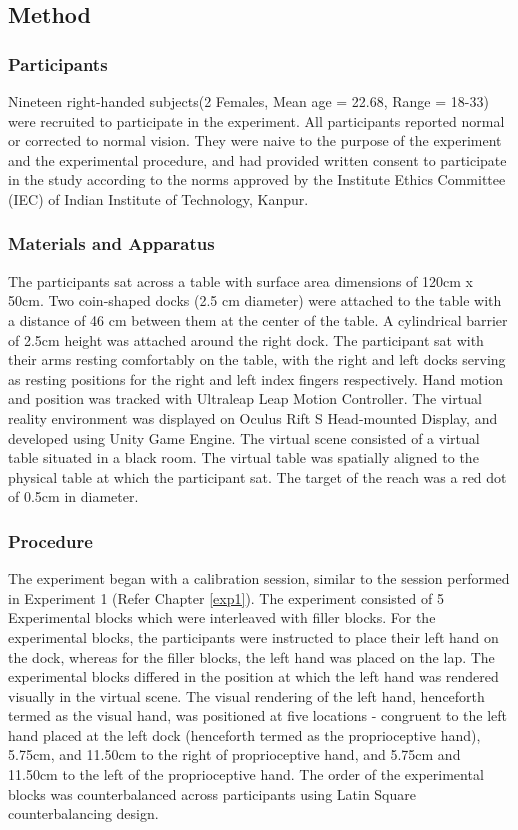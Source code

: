 \subsection{Method}

\subsubsection{Participants}
Nineteen right-handed subjects(2 Females, Mean age = 22.68, Range = 18-33) were recruited to participate in the experiment. All participants reported normal or corrected to normal vision. They were naive to the purpose of the experiment and the experimental procedure, and had provided written consent to participate in the study according to the norms approved by the Institute Ethics Committee (IEC) of Indian Institute of Technology, Kanpur. 

\subsubsection{Materials and Apparatus}
The participants sat across a table with surface area dimensions of 120cm x 50cm. Two coin-shaped docks (2.5 cm diameter) were attached to the table with a distance of 46 cm between them at the center of the table. A cylindrical barrier of 2.5cm height was attached around the right dock. The participant sat with their arms resting comfortably on the table, with the right and left docks serving as resting positions for the right and left index fingers respectively. Hand motion and position was tracked with Ultraleap Leap Motion Controller. The virtual reality environment was displayed on Oculus Rift S Head-mounted Display, and developed using Unity Game Engine. The virtual scene consisted of a virtual table situated in a black room. The virtual table was spatially aligned to the physical table at which the participant sat. The target of the reach was a red dot of 0.5cm in diameter. 

\subsubsection{Procedure}

The experiment began with a calibration session, similar to the session performed in Experiment 1 (Refer Chapter \ref{exp1}). The experiment consisted of 5 Experimental blocks which were interleaved with filler blocks. For the experimental blocks, the participants were instructed to place their left hand on the dock, whereas for the filler blocks, the left hand was placed on the lap. The experimental blocks differed in the position at which the left hand was rendered visually in the virtual scene. The visual rendering of the left hand, henceforth termed as the visual hand, was positioned at five locations - congruent to the left hand placed at the left dock (henceforth termed as the proprioceptive hand), 5.75cm, and 11.50cm to the right of proprioceptive hand, and 5.75cm and 11.50cm to the left of the proprioceptive hand. The order of the experimental blocks was counterbalanced across participants using Latin Square counterbalancing design. 

